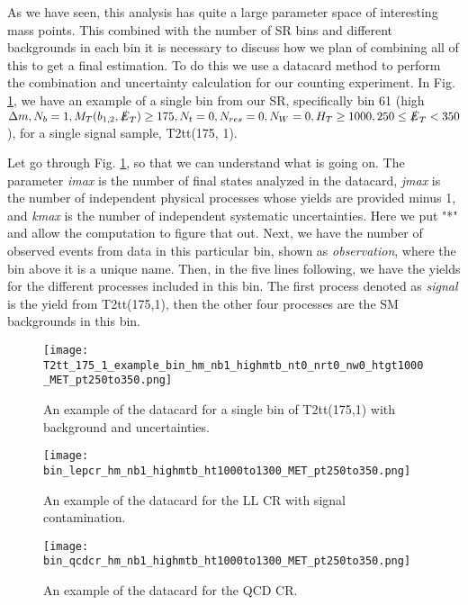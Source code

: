 As we have seen, this analysis has quite a large parameter space of interesting mass points. This combined with the number of SR bins and different backgrounds in each bin it is necessary to discuss how we plan of combining all of this to get a final estimation. To do this we use a datacard method to perform the combination and uncertainty calculation for our counting experiment. In Fig. \ref{fig:example-datacard-sig}, we have an example of a single bin from our SR, specifically bin 61 (high $\Delta m, N_{b}=1, M_{T}(b_{1,2},\slashed{E}_{T})\geq175, N_{t}=0, N_{res}=0, N_{W}=0, H_{T}\geq1000, 250\leq\slashed{E}_{T}<350$), for a single signal sample, T2tt(175, 1). 

Let go through Fig. \ref{fig:example-datacard-sig}, so that we can understand what is going on. The parameter \textit{imax} is the number of final states analyzed in the datacard, \textit{jmax} is the number of independent physical processes whose yields are provided minus 1, and \textit{kmax} is the number of independent systematic uncertainties. Here we put "*" and allow the computation to figure that out. Next, we have the number of observed events from data in this particular bin, shown as \textit{observation}, where the bin above it is a unique name. Then, in the five lines following, we have the yields for the different processes included in this bin. The first process denoted as \textit{signal} is the yield from T2tt(175,1), then the other four processes are the SM backgrounds in this bin. 

\begin{figure}
	\begin{center}
  \texttt{[image: T2tt\_175\_1\_example\_bin\_hm\_nb1\_highmtb\_nt0\_nrt0\_nw0\_htgt1000\_MET\_pt250to350.png]}
	\end{center}
	\caption[Example Datacard of T2tt(175,1)]{An example of the datacard for a single bin of T2tt(175,1) with background and uncertainties.
	 }
	\label{fig:example-datacard-sig}
\end{figure}
\begin{figure}
	\begin{center}
  \texttt{[image: bin\_lepcr\_hm\_nb1\_highmtb\_ht1000to1300\_MET\_pt250to350.png]}
	\end{center}
	\caption[Example Datacard of LL CR]{An example of the datacard for the LL CR with signal contamination.
	 }
	\label{fig:example-datacard-ll}
\end{figure}
\begin{figure}
	\begin{center}
  \texttt{[image: bin\_qcdcr\_hm\_nb1\_highmtb\_ht1000to1300\_MET\_pt250to350.png]}
	\end{center}
	\caption[Example Datacard of QCD CR]{An example of the datacard for the QCD CR.
	 }
	\label{fig:example-datacard-qcd}
\end{figure}

